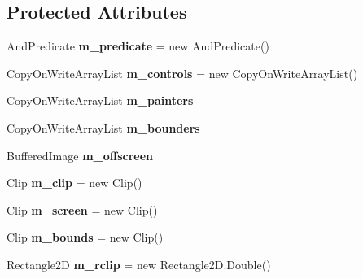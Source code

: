 \subsection*{\-Protected \-Attributes}
\begin{DoxyCompactItemize}
\item 
\hypertarget{classprefuse_1_1_display_a61f3da6aa012851ee2ec606e6828e099}{\-And\-Predicate {\bfseries m\-\_\-predicate} = new \-And\-Predicate()}\label{classprefuse_1_1_display_a61f3da6aa012851ee2ec606e6828e099}

\item 
\hypertarget{classprefuse_1_1_display_af96fbc6fa92a7676130dbc576e5e65b2}{\-Copy\-On\-Write\-Array\-List {\bfseries m\-\_\-controls} = new \-Copy\-On\-Write\-Array\-List()}\label{classprefuse_1_1_display_af96fbc6fa92a7676130dbc576e5e65b2}

\item 
\hypertarget{classprefuse_1_1_display_a1f99d1e7b9b969226c38c973ab5b056c}{\-Copy\-On\-Write\-Array\-List {\bfseries m\-\_\-painters}}\label{classprefuse_1_1_display_a1f99d1e7b9b969226c38c973ab5b056c}

\item 
\hypertarget{classprefuse_1_1_display_a4ad71964214e6334af8dfbf61872f098}{\-Copy\-On\-Write\-Array\-List {\bfseries m\-\_\-bounders}}\label{classprefuse_1_1_display_a4ad71964214e6334af8dfbf61872f098}

\item 
\hypertarget{classprefuse_1_1_display_a9e9c617becb4b37ee78056182510321b}{\-Buffered\-Image {\bfseries m\-\_\-offscreen}}\label{classprefuse_1_1_display_a9e9c617becb4b37ee78056182510321b}

\item 
\hypertarget{classprefuse_1_1_display_aea8b79811c94fa2a494b9af0ae0a1559}{\-Clip {\bfseries m\-\_\-clip} = new \-Clip()}\label{classprefuse_1_1_display_aea8b79811c94fa2a494b9af0ae0a1559}

\item 
\hypertarget{classprefuse_1_1_display_ae0cf1114d017f9bec375870aaf8d3575}{\-Clip {\bfseries m\-\_\-screen} = new \-Clip()}\label{classprefuse_1_1_display_ae0cf1114d017f9bec375870aaf8d3575}

\item 
\hypertarget{classprefuse_1_1_display_a6bee06cb9f85bcb273d5acfa55476d83}{\-Clip {\bfseries m\-\_\-bounds} = new \-Clip()}\label{classprefuse_1_1_display_a6bee06cb9f85bcb273d5acfa55476d83}

\item 
\hypertarget{classprefuse_1_1_display_a6bc3aa0caced242bddd5e9d54384e383}{\-Rectangle2\-D {\bfseries m\-\_\-rclip} = new \-Rectangle2\-D.\-Double()}\label{classprefuse_1_1_display_a6bc3aa0caced242bddd5e9d54384e383}


\end{DoxyCompactItemize}
